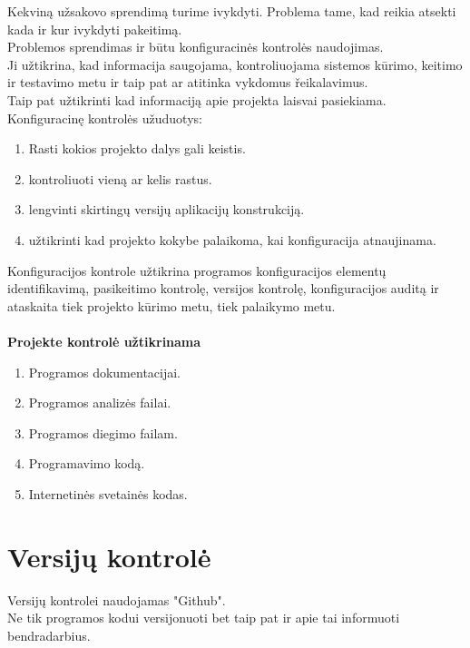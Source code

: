 \documentclass[a4paper,12pt]{article}
\begin{document}
Kekvin\k a u\v zsakovo sprendim\k a turime ivykdyti. Problema tame, kad reikia atsekti kada ir kur ivykdyti pakeitim\k a.\\
Problemos sprendimas ir b\= utu konfiguracin\. es kontrol\. es naudojimas.\\
Ji u\v ztikrina, kad informacija saugojama, kontroliuojama sistemos k\= urimo, keitimo ir testavimo metu ir taip pat ar atitinka vykdomus \v reikalavimus. \\
Taip pat u\v ztikrinti kad informacij\k a apie projekta laisvai pasiekiama.\\

Konfiguracin\k e kontrol\. es u\v zuduotys:
\begin{enumerate}
	\item Rasti kokios projekto dalys gali keistis.
	\item kontroliuoti vien\k a ar kelis rastus.
	\item lengvinti skirting\k u versij\k u aplikacij\k u konstrukcij\k a. 
	\item u\v ztikrinti kad projekto kokybe palaikoma, kai konfiguracija atnaujinama.
\end{enumerate}


Konfiguracijos kontrole u\v ztikrina programos konfiguracijos element\k u identifikavim\k a, pasikeitimo kontrol\k e, versijos kontrol\k e, konfiguracijos audit\k a ir ataskaita tiek projekto k\= urimo metu, tiek palaikymo metu.\\\\


\large\textbf{Projekte kontrol\. e u\v ztikrinama}
\normalsize
\begin{enumerate}
	\item Programos dokumentacijai.
	\item Programos analiz\. es failai.
	\item Programos diegimo failam.
	\item Programavimo kodą.
	\item Internetinės svetainės kodas.
\end{enumerate}

\clearpage

\section{Versij\k u kontrol\. e}

Versij\k u kontrolei naudojamas "Github".\\
Ne tik programos kodui versijonuoti bet taip pat ir apie tai informuoti bendradarbius.\\
\end{document}
